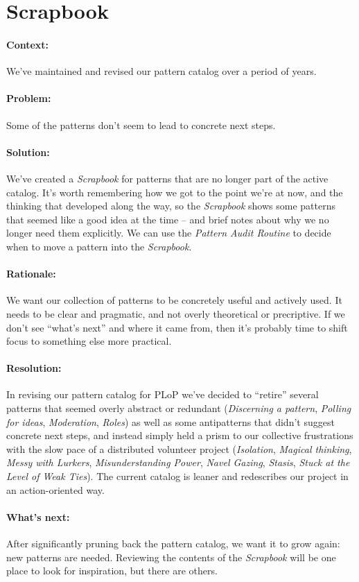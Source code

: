 \section{Scrapbook}

\paragraph{Context:} We've maintained and revised our pattern catalog over a period of years.
\paragraph{Problem:} Some of the patterns don't seem to lead to concrete next steps.
\paragraph{Solution:} We've created a \emph{Scrapbook} for patterns that are no longer part of the active catalog.  It's worth remembering how we got to the point we're at now, and the thinking that developed along the way, so the \emph{Scrapbook} shows some patterns that seemed like a good idea at the time -- and brief notes about why we no longer need them explicitly.  We can use the \emph{Pattern Audit Routine} to decide when to move a pattern into the \emph{Scrapbook}.
\paragraph{Rationale:} We want our collection of patterns to be concretely useful and actively used.  It needs to be clear and pragmatic, and not overly theoretical or precriptive.  If we don't see ``what's next'' and where it came from, then it's probably time to shift focus to something else more practical.
\paragraph{Resolution:}  In revising our pattern catalog for PLoP we've decided to ``retire'' several patterns that seemed overly abstract or redundant (\emph{Discerning a pattern}, \emph{Polling for ideas}, \emph{Moderation}, \emph{Roles}) as well as some antipatterns that didn't suggest concrete next steps, and instead simply held a prism to our collective frustrations with the slow pace of a distributed volunteer project (\emph{Isolation}, \emph{Magical thinking}, \emph{Messy with Lurkers}, \emph{Misunderstanding Power}, \emph{Navel Gazing}, \emph{Stasis}, \emph{Stuck at the Level of Weak Ties}).  The current catalog is leaner and redescribes our project in an action-oriented way. 
\paragraph{What's next:} After significantly pruning back the pattern catalog, we want it to grow again: new patterns are needed.  Reviewing the contents of the \emph{Scrapbook} will be one place to look for inspiration, but there are others.

